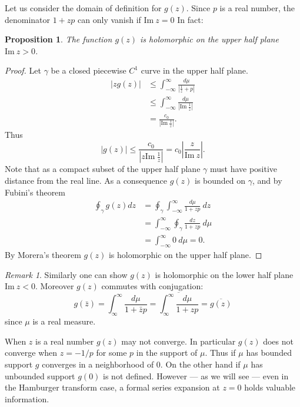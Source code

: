 \documentclass{amsart}
\newtheorem{proposition}[theorem]{Proposition}
\theoremstyle{remark}
\newtheorem{remark}[theorem]{Remark}
\numberwithin{equation}{section}
\newcommand{\im}{\text{Im}~}
\begin{document}
Let us consider the domain of definition for $g(z)$. Since $p$ is a real number, the denominator $1 + zp$ can only vanish if $\im z = 0$ In fact:
\begin{proposition}
The function $g(z)$ is holomorphic on the upper half plane $\im z > 0$.
\end{proposition}
\begin{proof}
Let $\gamma$ be a closed piecewise $C^1$ curve in the upper half plane. 
\begin{align*}
    |zg(z)| 
    &\leq \int_{-\infty}^\infty \frac{d\mu}{|\frac1z + p|} \\
    &\leq \int_{-\infty}^\infty \frac{d\mu}{|\im \frac1z|} \\
    &= \frac{c_0}{|\im \frac1z|}.
\end{align*}
Thus
\[
    |g(z)| \leq \frac{c_0}{|z \im \frac1z|} = c_0\left|\frac{z}{\im z}\right|.
\]
Note that as a compact subset of the upper half plane $\gamma$ must have positive distance from the real line. As a consequence $g(z)$ is bounded on $\gamma$, and by Fubini's theorem
\begin{align*}
    \oint_\gamma g(z) dz
    &= \oint_\gamma \int_{-\infty}^\infty \frac{d\mu}{1 + zp} ~dz \\
    &= \int_{-\infty}^\infty \oint_\gamma \frac{dz}{1 + zp} ~d\mu \\
    &= \int_{-\infty}^\infty 0 ~d\mu = 0.
\end{align*}
By Morera's theorem $g(z)$ is holomorphic on the upper half plane.
\end{proof}

\begin{remark}
Similarly one can show $g(z)$ is holomorphic on the lower half plane $\im z < 0$. Moreover $g(z)$ commutes with conjugation:
\[
    g(\bar z) = \int_\infty^\infty\frac{d\mu}{1+\bar zp} = \overline{\int_\infty^\infty\frac{d\mu}{1+zp}} = \overline{g(z)}
\]
since $\mu$ is a real measure.
\end{remark}


When $z$ is a real number $g(z)$ may not converge. In particular $g(z)$ does not converge when $z = -1/p$ for some $p$ in the support of $\mu$. Thus if $\mu$ has bounded support $g$ converges in a neighborhood of $0$. On the other hand if $\mu$ has unbounded support $g(0)$ is not defined. However — as we will see — even in the Hamburger transform case, a formal series expansion at $z = 0$ holds valuable information.
\end{document}
